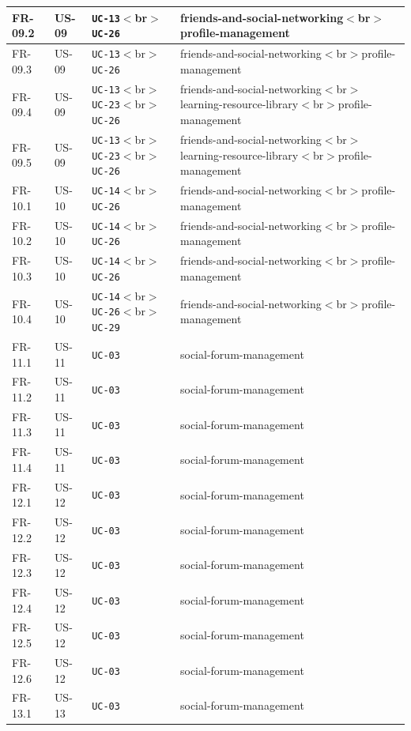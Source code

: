\documentclass[12pt]{article}
\begin{document}
\begin{longtable}{|>{\raggedright\arraybackslash}p{}|>{\raggedright\arraybackslash}p{}|>{\raggedright\arraybackslash}p{}|>{\raggedright\arraybackslash}p{}|}
FR-09.2 & US-09 & \texttt{UC-13}$<$br$>$\texttt{UC-26} & friends-and-social-networking$<$br$>$profile-management \\ \hline
FR-09.3 & US-09 & \texttt{UC-13}$<$br$>$\texttt{UC-26} & friends-and-social-networking$<$br$>$profile-management \\ \hline
FR-09.4 & US-09 & \texttt{UC-13}$<$br$>$\texttt{UC-23}$<$br$>$\texttt{UC-26} & friends-and-social-networking$<$br$>$learning-resource-library$<$br$>$profile-management \\ \hline
FR-09.5 & US-09 & \texttt{UC-13}$<$br$>$\texttt{UC-23}$<$br$>$\texttt{UC-26} & friends-and-social-networking$<$br$>$learning-resource-library$<$br$>$profile-management \\ \hline
FR-10.1 & US-10 & \texttt{UC-14}$<$br$>$\texttt{UC-26} & friends-and-social-networking$<$br$>$profile-management \\ \hline
FR-10.2 & US-10 & \texttt{UC-14}$<$br$>$\texttt{UC-26} & friends-and-social-networking$<$br$>$profile-management \\ \hline
FR-10.3 & US-10 & \texttt{UC-14}$<$br$>$\texttt{UC-26} & friends-and-social-networking$<$br$>$profile-management \\ \hline
FR-10.4 & US-10 & \texttt{UC-14}$<$br$>$\texttt{UC-26}$<$br$>$\texttt{UC-29} & friends-and-social-networking$<$br$>$profile-management \\ \hline
FR-11.1 & US-11 & \texttt{UC-03} & social-forum-management \\ \hline
FR-11.2 & US-11 & \texttt{UC-03} & social-forum-management \\ \hline
FR-11.3 & US-11 & \texttt{UC-03} & social-forum-management \\ \hline
FR-11.4 & US-11 & \texttt{UC-03} & social-forum-management \\ \hline
FR-12.1 & US-12 & \texttt{UC-03} & social-forum-management \\ \hline
FR-12.2 & US-12 & \texttt{UC-03} & social-forum-management \\ \hline
FR-12.3 & US-12 & \texttt{UC-03} & social-forum-management \\ \hline
FR-12.4 & US-12 & \texttt{UC-03} & social-forum-management \\ \hline
FR-12.5 & US-12 & \texttt{UC-03} & social-forum-management \\ \hline
FR-12.6 & US-12 & \texttt{UC-03} & social-forum-management \\ \hline
FR-13.1 & US-13 & \texttt{UC-03} & social-forum-management \\ \hline

\end{longtable}
\end{document}
